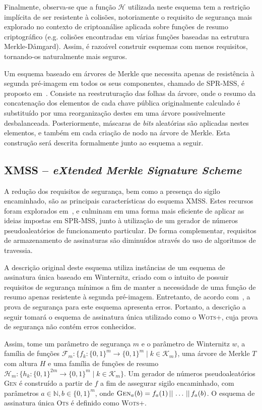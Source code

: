 \documentclass[12pt]{report}
\newcommand{\hh}{\mathcal{H}}
\newcommand{\concat}{\, \vert \vert \,}
\newcommand{\binwds}[1]{\{0, 1\}^{#1}}
\begin{document}
Finalmente, observa-se que a função $\hh{}$ utilizada neste esquema tem a restrição implícita de ser resistente à colisões, notoriamente o requisito de segurança mais explorado no contexto de criptoanálise aplicada sobre funções de resumo criptográfico (e.g. colisões encontradas em várias funções baseadas na estrutura Merkle-D\aa{}mgard). Assim, é razoável construir esquemas com menos requisitos, tornando-os naturalmente mais seguros.

Um esquema baseado em árvores de Merkle que necessita apenas de resistência à segunda pré-imagem em todos os seus componentes, chamado de SPR-MSS, é proposto em~\cite{Dahmen:2008:DSO:1473109.1473117}. Consiste na reestruturação das folhas da árvore, onde o resumo da concatenação dos elementos de cada chave pública originalmente calculado é substituído por uma reorganização destes em uma árvore possivelmente desbalanceada. Posteriormente, máscaras de \emph{bits} aleatórias são aplicadas nestes elementos, e também em cada criação de nodo na árvore de Merkle. Esta construção será descrita formalmente junto ao esquema a seguir.

\subsection{XMSS -- \emph{eXtended Merkle Signature Scheme}}

A redução dos requisitos de segurança, bem como a presença do sigilo encaminhado, são as principais características do esquema XMSS. Estes recursos foram explorados em~\cite{Buchmann:2011:XPF:2184003.2184011}, e culminam em uma forma mais eficiente de aplicar as ideias impostas em SPR-MSS, junto à utilização de um gerador de números pseudoaleatórios de funcionamento particular. De forma complementar, requisitos de armazenamento de assinaturas são diminuídos através do uso de algoritmos de travessia.

A descrição original deste esquema utiliza instâncias de um esquema de assinatura única baseado em Winternitz, criado com o intuito de possuir requisitos de segurança mínimos a fim de manter a necessidade de uma função de resumo apenas resistente à segunda pré-imagem. Entretanto, de acordo com~\cite{LafrancePhilip2017}, a prova de segurança para este esquema apresenta erros. Portanto, a descrição a seguir tomará o esquema de assinatura única utilizado como o \textsc{Wots+}, cuja prova de segurança não contém erros conhecidos.

Assim, tome um parâmetro de segurança $m$ e o parâmetro de Winternitz $w$, a família de funções $\mathcal{F}_m : \{f_k : \binwds{m} \longrightarrow \binwds{m} \mid k \in
\mathcal{K}_m\}$, uma árvore de Merkle $T$ com altura $H$ e uma família de funções de resumo $\hh{}_m : \{h_k : \binwds{2m} \longrightarrow \binwds{m} \mid k \in
\mathcal{K}_m\}$. Um gerador de números pseudoaleatórios \textsc{Gen} é construído a partir de $f$ a fim de assegurar sigilo encaminhado, com parâmetros $a \in \mathbb{N}, b \in \binwds{m}$, onde $\textsc{Gen}_{a}(b) = f_a(1) \concat \dots \concat f_a(b)$. O esquema de assinatura única \textsc{Ots} é definido como \textsc{Wots+}.
\end{document}
